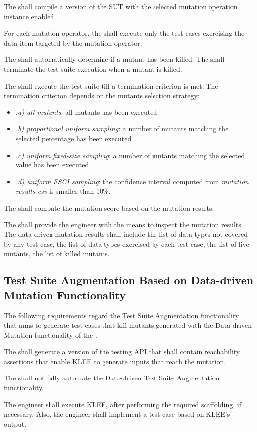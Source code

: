 \RQ{} The \FAQAS shall compile a version of the SUT with the selected mutation operation instance enabled.

\RQ{} For each mutation operator, the \FAQAS shall execute only the test cases exercising the data item targeted by the mutation operator.

\RQ{} The \FAQAS shall automatically determine if a mutant has been killed. The \FAQAS shall terminate the test suite execution when a mutant is killed.

\RQ{} The \FAQAS shall execute the test suite till a termination criterion is met. The termination criterion depends on the mutants selection strategy:
\begin{itemize}
\item \emph{.a) all mutants}: all mutants has been executed
\item \emph{.b) proportional uniform sampling}: a number of mutants matching the selected percentage has been executed
\item \emph{.c) uniform fixed-size sampling}: a number of mutants matching the selected value has been executed
\item \emph{.d) uniform FSCI sampling}: the confidence interval computed from \emph{mutation results csv} is smaller than 10\%.
\end{itemize}

\RQ{} The \FAQAS shall compute the mutation score based on the mutation results.

\RQ{} The \FAQAS shall provide the engineer with the means to inspect the mutation results. The \FAQAS data-driven mutation results shall include the list of data types not covered by any test case, the list of data types exercised by each test case, the list of live mutants, the list of killed mutants.


\subsection{Test Suite Augmentation Based on Data-driven Mutation Functionality}
\label{sec:codeDrivenAugmentation}

The following requirements regard the Test Suite Augmentation functionality that aims to generate test cases that kill mutants generated with the Data-driven Mutation functionality of the \FAQAS.

\RQ{} The \FAQAS shall generate a version of the testing API that shall contain reachability assertions that enable KLEE to generate inputs that reach the mutation.

\RQ{} The \FAQAS shall not fully automate the Data-driven Test Suite Augmentation functionality.

\remark The engineer shall execute KLEE, after performing the required scaffolding, if necessary.
Also, the engineer shall implement a test case based on KLEE's output.
